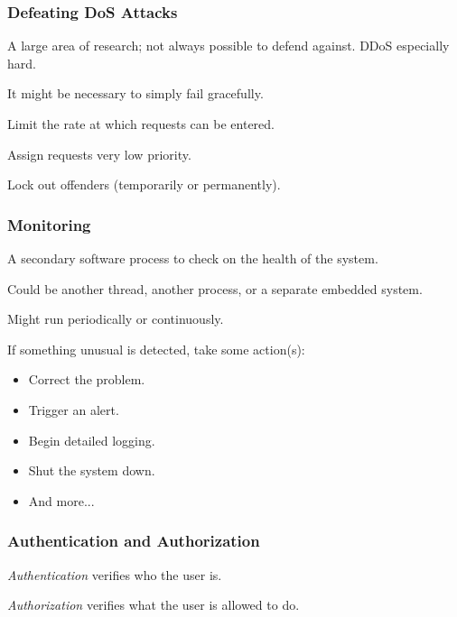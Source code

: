 \begin{frame}
\frametitle{Defeating DoS Attacks}
\begin{changemargin}{1cm}

A large area of research; not always possible to defend against. DDoS especially hard.

It might be necessary to simply fail gracefully.

Limit the rate at which requests can be entered. 

Assign requests very low priority. 

Lock out offenders (temporarily or permanently).
\end{changemargin}
\end{frame}

\begin{frame}
\frametitle{Monitoring}
\begin{changemargin}{1cm}

A secondary software process to check on the health of the system.

Could be another thread, another process, or a separate embedded system.

Might run periodically or continuously.

If something unusual is detected, take some action(s):
\begin{itemize}
	\item Correct the problem.
	\item Trigger an alert.
	\item Begin detailed logging.
	\item Shut the system down.
	\item And more...
\end{itemize}

\end{changemargin}
\end{frame}

\begin{frame}
\frametitle{Authentication and Authorization}
\begin{changemargin}{1cm}

\textit{Authentication} verifies who the user is. 

\textit{Authorization} verifies what the user is allowed to do. 

\end{changemargin}
\end{frame}


